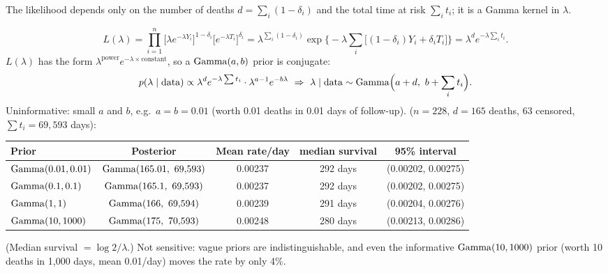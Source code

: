 \documentclass[11pt]{article}
\begin{document}
\begin{keyidea}
The likelihood depends only on the number of deaths $d=\sum_i(1-\delta_i)$ and the total time at risk $\sum_it_i$; it is a Gamma kernel in $\lambda$.
\end{keyidea}

\solution
{}
\[
L(\lambda)=\prod_{i=1}^n\big[\lambda e^{-\lambda Y_i}\big]^{1-\delta_i}\big[e^{-\lambda T_i}\big]^{\delta_i}
=\lambda^{\sum_i(1-\delta_i)}\exp\Big\{-\lambda\sum_i\big[(1-\delta_i)Y_i+\delta_iT_i\big]\Big\}=\lambda^{d}e^{-\lambda\sum_it_i}.
\]
 $L(\lambda)$ has the form $\lambda^{\text{power}}e^{-\lambda\times\text{constant}}$, so a $\mathrm{Gamma}(a,b)$ prior is conjugate:
\[
p(\lambda\mid\text{data})\propto\lambda^d e^{-\lambda\sum t_i}\cdot\lambda^{a-1}e^{-b\lambda}\ \Rightarrow\ \lambda\mid\text{data}\sim\dist{Gamma}\Big(a+d,\ b+\sum_it_i\Big).
\]
Uninformative: small $a$ and $b$, e.g.\ $a=b=0.01$ (worth 0.01 deaths in 0.01 days of follow-up).
 ($n=228$, $d=165$ deaths, 63 censored, $\sum t_i=69{,}593$ days):
\begin{center}
\small
\begin{tabular}{lcccc}\toprule
Prior & Posterior & Mean rate/day & median survival & 95\% interval\\\midrule
$\mathrm{Gamma}(0.01,0.01)$ & $\mathrm{Gamma}(165.01,\ 69{,}593)$ & 0.00237 & 292 days & (0.00202, 0.00275)\\
$\mathrm{Gamma}(0.1,0.1)$ & $\mathrm{Gamma}(165.1,\ 69{,}593)$ & 0.00237 & 292 days & (0.00202, 0.00275)\\
$\mathrm{Gamma}(1,1)$ & $\mathrm{Gamma}(166,\ 69{,}594)$ & 0.00239 & 291 days & (0.00204, 0.00276)\\
$\mathrm{Gamma}(10,1000)$ & $\mathrm{Gamma}(175,\ 70{,}593)$ & 0.00248 & 280 days & (0.00213, 0.00286)\\\bottomrule
\end{tabular}
\end{center}
(Median survival $=\log2/\lambda$.) Not sensitive: vague priors are indistinguishable, and even the informative $\mathrm{Gamma}(10,1000)$ prior (worth 10 deaths in 1{,}000 days, mean 0.01/day) moves the rate by only 4\%.
\end{document}
